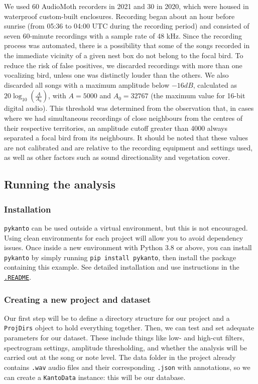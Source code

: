 We used 60 AudioMoth recorders \parencite{hill2019} in 2021 and 30 in 2020, which were housed in waterproof custom-built enclosures. Recording began about an hour before sunrise (from 05:36 to 04:00 UTC during the recording period) and consisted of seven 60-minute recordings with a sample rate of 48 kHz. Since the recording process was automated, there is a possibility that some of the songs recorded in the immediate vicinity of a given nest box do not belong to the focal bird. To reduce the risk of false positives, we discarded recordings with more than one vocalizing bird, unless one was distinctly louder than the others. We also discarded all songs with a maximum amplitude below $-16 dB$, calculated as $20\log_{10} \left (\frac{A}{A_{0}}\right )$, with $A = 5000$ and $A_{0} = 32767$ (the maximum value for 16-bit digital audio). This threshold was determined from the observation that, in cases where we had simultaneous recordings of close neighbours from the centres of their respective territories, an amplitude cutoff greater than 4000 always separated a focal bird from its neighbours. It should be noted that these values are not calibrated and are relative to the recording equipment and settings used, as well as other factors such as sound directionality and vegetation cover.

\subsection{Running the analysis}
\subsubsection{Installation}

\texttt{pykanto} can be used outside a virtual environment, but this is not encouraged.
Using clean environments for each project will allow you to avoid dependency issues. Once inside a new environment with Python 3.8 or above, you can
install \texttt{pykanto} by simply running \texttt{pip install pykanto}, then install the
package containing this example. See detailed installation and use instructions
in the \href{https://github.com/nilomr/pykanto-example}{\texttt{.README}}.

\subsubsection{Creating a new project and dataset}

Our first step will be to define a directory structure for our project and a
\texttt{ProjDirs} object to hold everything together. Then, we can test and set
adequate parameters for our dataset. These include things like low- and high-cut
filters, spectrogram settings, amplitude thresholding, and whether the analysis
will be carried out at the song or note level. The data folder in the project
already contains \texttt{.wav} audio files and their corresponding
\texttt{.json} with annotations, so we can create a \texttt{KantoData} instance:
this will be our database.

